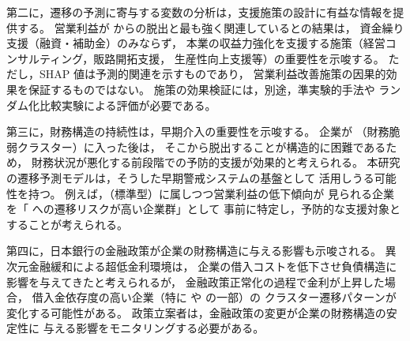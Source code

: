 第二に，遷移の予測に寄与する変数の分析は，支援施策の設計に有益な情報を提供する。
営業利益が  からの脱出と最も強く関連しているとの結果は，
資金繰り支援（融資・補助金）のみならず，
本業の収益力強化を支援する施策（経営コンサルティング，販路開拓支援，
生産性向上支援等）の重要性を示唆する。
ただし，SHAP 値は予測的関連を示すものであり，
営業利益改善施策の因果的効果を保証するものではない。
施策の効果検証には，別途，準実験的手法や
ランダム化比較実験による評価が必要である。

第三に，財務構造の持続性は，早期介入の重要性を示唆する。
企業が （財務脆弱クラスター）に入った後は，
そこから脱出することが構造的に困難であるため，
財務状況が悪化する前段階での予防的支援が効果的と考えられる。
本研究の遷移予測モデルは，そうした早期警戒システムの基盤として
活用しうる可能性を持つ。
例えば，（標準型）に属しつつ営業利益の低下傾向が
見られる企業を「 への遷移リスクが高い企業群」として
事前に特定し，予防的な支援対象とすることが考えられる。

第四に，日本銀行の金融政策が企業の財務構造に与える影響も示唆される。
異次元金融緩和による超低金利環境は，
企業の借入コストを低下させ負債構造に影響を与えてきたと考えられるが，
金融政策正常化の過程で金利が上昇した場合，
借入金依存度の高い企業（特に  や  の一部）の
クラスター遷移パターンが変化する可能性がある。
政策立案者は，金融政策の変更が企業の財務構造の安定性に
与える影響をモニタリングする必要がある。
